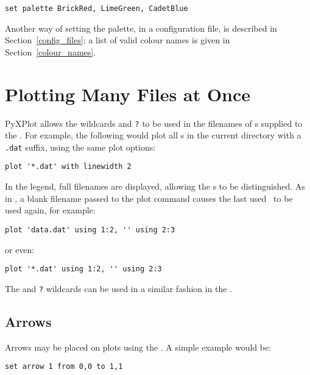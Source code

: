\begin{verbatim}
set palette BrickRed, LimeGreen, CadetBlue
\end{verbatim}

\noindent Another way of setting the palette, in a configuration file, is
described in Section~\ref{config_files}; a list of valid colour names is given
in Section~\ref{colour_names}.

\section{Plotting Many Files at Once}


PyXPlot allows the wildcards {\tt *} and {\tt ?} to be used in the filenames of
\datafile s supplied to the .  For example, the following would
plot all \datafile s in the current directory with a {\tt .dat} suffix, using
the same plot options:

\begin{verbatim}
plot '*.dat' with linewidth 2
\end{verbatim}

\noindent In the legend, full filenames are displayed, allowing the \datafile s
to be distinguished.  As in \gnuplot, a blank filename passed to the plot
command causes the last used \datafile\ to be used again, for example:

\begin{verbatim}
plot 'data.dat' using 1:2, '' using 2:3
\end{verbatim}

\noindent or even:

\begin{verbatim}
plot '*.dat' using 1:2, '' using 2:3
\end{verbatim}

The {\tt *} and {\tt ?} wildcards can be used in a similar fashion in the
.

\subsection{Arrows}

\label{set_arrow} Arrows may be placed on plots using the
. A simple example would be:

\begin{verbatim}
set arrow 1 from 0,0 to 1,1
\end{verbatim}

